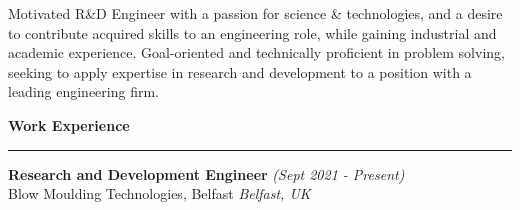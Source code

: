 \documentclass[11pt]{resume} %
\begin{document}
\begin{center}
    Motivated R\&D Engineer with a passion for science \& technologies, and a desire to 
    contribute acquired skills to an engineering role, while gaining industrial and academic experience. 
    Goal-oriented and technically proficient in problem solving, seeking to apply expertise in 
    research and development to a position with a leading engineering firm.
\end{center}
\vspace{2mm}

{\large \bf Work Experience} \sectionlineskip \hrule
\textbf{Research and Development Engineer} \hfill \textit{(Sept 2021 - Present)}\\
Blow Moulding Technologies, Belfast \hfill \textit{Belfast, UK}\\ 

\vspace{-3mm}
\\
\hspace*{5mm}{
        Part of internal team with role of software and control development lead,
        aim to design Digital Twin technologies of Stretch Blow Moulding Process, long
        term project collaborating with 2 major F\&B manufacturing brand.
    }
\end{document}

